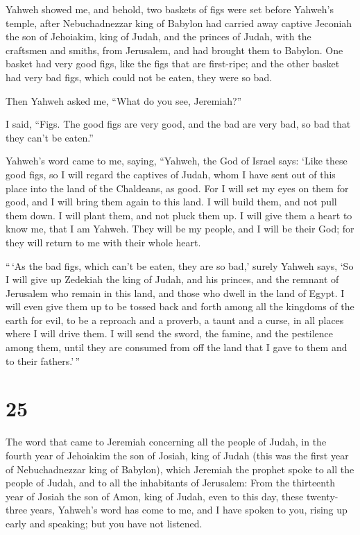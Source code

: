  Yahweh showed me, and behold, two baskets of figs were set
before Yahweh's temple, after Nebuchadnezzar king of Babylon had carried
away captive Jeconiah the son of Jehoiakim, king of Judah, and the
princes of Judah, with the craftsmen and smiths, from Jerusalem, and had
brought them to Babylon.  One basket had very good figs,
like the figs that are first-ripe; and the other basket had very bad
figs, which could not be eaten, they were so bad.

 Then Yahweh asked me, ``What do you see, Jeremiah?''

I said, ``Figs. The good figs are very good, and the bad are very bad,
so bad that they can't be eaten.''

 Yahweh's word came to me, saying,  ``Yahweh,
the God of Israel says: `Like these good figs, so I will regard the
captives of Judah, whom I have sent out of this place into the land of
the Chaldeans, as good.  For I will set my eyes on them for
good, and I will bring them again to this land. I will build them, and
not pull them down. I will plant them, and not pluck them up.
 I will give them a heart to know me, that I am Yahweh. They
will be my people, and I will be their God; for they will return to me
with their whole heart.

 ``\,`As the bad figs, which can't be eaten, they are so
bad,' surely Yahweh says, `So I will give up Zedekiah the king of Judah,
and his princes, and the remnant of Jerusalem who remain in this land,
and those who dwell in the land of Egypt.  I will even give
them up to be tossed back and forth among all the kingdoms of the earth
for evil, to be a reproach and a proverb, a taunt and a curse, in all
places where I will drive them.  I will send the sword, the
famine, and the pestilence among them, until they are consumed from off
the land that I gave to them and to their fathers.'\,''

\hypertarget{section-24}{%
\section{25}\label{section-24}}

 The word that came to Jeremiah concerning all the people of
Judah, in the fourth year of Jehoiakim the son of Josiah, king of Judah
(this was the first year of Nebuchadnezzar king of Babylon),
 which Jeremiah the prophet spoke to all the people of
Judah, and to all the inhabitants of Jerusalem:  From the
thirteenth year of Josiah the son of Amon, king of Judah, even to this
day, these twenty-three years, Yahweh's word has come to me, and I have
spoken to you, rising up early and speaking; but you have not listened.

